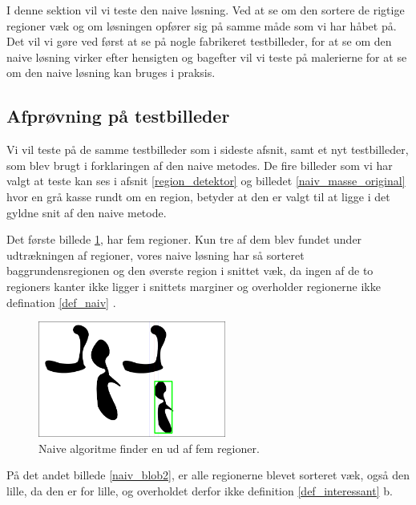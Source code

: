 {\sffamily
I denne sektion vil vi teste den naive løsning. Ved at se om den sortere
de rigtige regioner væk og om løsningen opfører sig på samme måde som vi
har håbet på. Det vil vi gøre ved først at se på nogle fabrikeret
testbilleder, for at se om den naive løsning virker efter hensigten og
bagefter vil vi teste på malerierne for at se om den naive løsning kan
bruges i praksis.
}
  
\subsection{Afprøvning på testbilleder}
Vi vil teste på de samme testbilleder som i sideste afsnit, samt et nyt
testbilleder, som blev brugt i forklaringen af den naive metodes. De fire
billeder som vi har valgt at teste kan ses i afsnit \ref{region_detektor}
og billedet \ref{naiv_masse_original} hvor en grå kasse rundt om en
region, betyder at den er valgt til at ligge i det gyldne snit af den
naive metode. 

Det første billede \ref{naiv_blob1}, har fem regioner. Kun tre af
dem blev fundet under udtrækningen af regioner, vores naive løsning har så
sorteret baggrundensregionen og den øverste region i snittet væk, da
ingen af de to regioners kanter ikke ligger i snittets marginer og
overholder regionerne ikke defination \ref{def_naiv} . 

\begin{figure}[!h]
	\begin{center}
        \includegraphics[angle=0,width=0.55\textwidth]{afsnit/afprovning/billeder/naive_losning/naiv_blob1.png}
	\end{center}       
	\caption{Naive algoritme finder en ud af fem regioner.}	
	\label{naiv_blob1}
\end{figure}

På det andet billede \ref{naiv_blob2}, er alle regionerne blevet sorteret væk, også
den lille, da den er for lille, og overholdet derfor ikke definition
\ref{def_interessant} b. 

